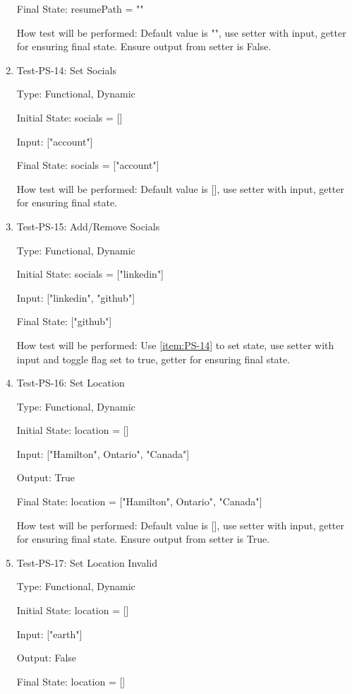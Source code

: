 \documentclass[12pt, titlepage]{article}
\makeatletter
\def\itemlabel#1#2{\def\@currentlabel{#2}\phantomsection\label{#1}}
\makeatother
\begin{document}
\begin{enumerate}
Final State: resumePath = ""

How test will be performed: Default value is "", use setter with input, getter for ensuring final state. Ensure output from setter is False.
\item{\itemlabel{item:PS-14}{Test-PS-14} Test-PS-14: Set Socials\\}

Type: Functional, Dynamic

Initial State: socials = []

Input: ["account"]

Final State: socials = ["account"]

How test will be performed: Default value is [], use setter with input, getter for ensuring final state.
\item{Test-PS-15: Add/Remove Socials\\}

Type: Functional, Dynamic

Initial State: socials = ["linkedin"]

Input: ["linkedin", "github"]

Final State: ["github"] 

How test will be performed: Use \ref{item:PS-14} to set state, use setter with input and toggle flag set to true, getter for ensuring final state.
\item{Test-PS-16: Set Location\\}

Type: Functional, Dynamic

Initial State: location = []

Input: ["Hamilton", Ontario", "Canada"]

Output: True

Final State: location = ["Hamilton", Ontario", "Canada"]

How test will be performed: Default value is [], use setter with input, getter for ensuring final state. Ensure output from setter is True.
\item{Test-PS-17: Set Location Invalid\\}

Type: Functional, Dynamic

Initial State: location = []

Input: ["earth"]

Output: False

Final State: location = []


\end{enumerate}
\end{document}
